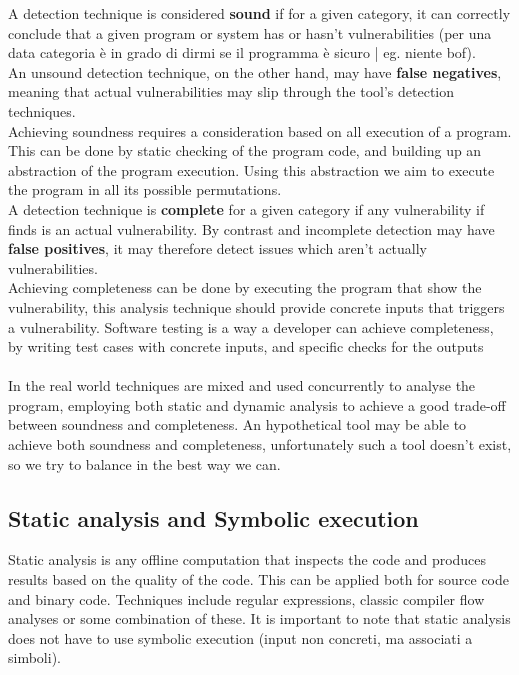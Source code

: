 \documentclass[11pt, oneside]{article}   	%
\begin{document}
A detection technique is considered \textbf{sound} if for a given category, it can correctly conclude that a given program or system has or hasn't vulnerabilities (per una data categoria è in grado di dirmi se il programma è sicuro | eg. niente bof).\\
An unsound detection technique, on the other hand, may have \textbf{false negatives}, meaning that actual vulnerabilities may slip through the tool's detection techniques.\\
Achieving soundness requires a consideration based on all execution of a program. This can be done by static checking of the program code, and building up an abstraction of the program execution. Using this abstraction we aim to execute the program in all its possible permutations.\\


A detection technique is \textbf{complete} for a given category if any vulnerability if finds is an actual vulnerability. By contrast and incomplete detection may have \textbf{false positives}, it may therefore detect issues which aren't actually vulnerabilities.\\
Achieving completeness can be done by executing the program that show the vulnerability, this analysis technique should provide concrete inputs that triggers a vulnerability. Software testing is a way a developer can achieve completeness, by writing test cases with concrete inputs, and specific checks for the outputs\\\\
In the real world techniques are mixed and used concurrently to analyse the program, employing both static and dynamic analysis to achieve a good trade-off between soundness and completeness. An hypothetical tool may be able to achieve both soundness and completeness, unfortunately such a tool doesn't exist, so we try to balance in the best way we can.

\subsection*{Static analysis and Symbolic execution}
Static analysis is any offline computation that inspects the code and produces results based on the quality of the code. This can be applied both for source code and binary code. 
Techniques include regular expressions, classic compiler flow analyses or some combination of these. It is important to note that static analysis does not have to use symbolic execution (input non concreti, ma associati a simboli). \\
\end{document}
